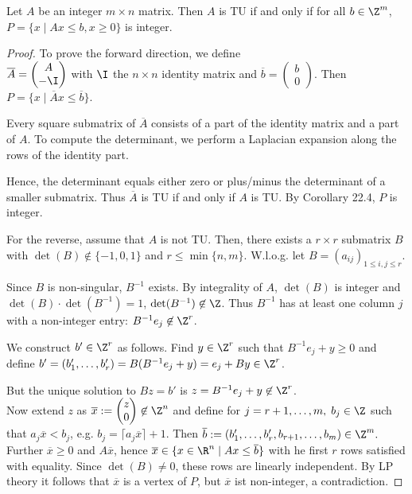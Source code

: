 \begin{thm}
Let $A$ be an integer $m \times n$ matrix.
Then $A$ is TU if and only if for all $b \in \Z^m$, $P = \{x \mid Ax \leq b,
x \geq 0\}$ is integer.
\end{thm}
\begin{proof}
To prove the forward direction, we define \\
$\overline{A} = \begin{pmatrix} A \\ -\I \end{pmatrix}$ with $\I$ the $n
\times n$ identity matrix and $\overline{b} = \begin{pmatrix} b \\ 0
\end{pmatrix}$.
Then $P = \{ x \mid \overline{A} x \leq \overline{b} \}$.

Every square submatrix of $\overline{A}$ consists of a part of the identity
matrix and a part of $A$. To compute the determinant, we perform a Laplacian
expansion along the rows of the identity part.

Hence, the determinant equals either zero or plus/minus the determinant of a
smaller submatrix. Thus $\overline{A}$ is TU if and only if $A$ is TU.
By Corollary 22.4, $P$ is integer.

For the reverse, assume that $A$ is not TU.
Then, there exists a $r \times r$ submatrix $B$ with $\det(B) \not\in
\{-1,0,1\}$ and $r \leq \min\{n,m\}$.
W.l.o.g. let $B = (a_{ij})_{1 \leq i,j \leq r}$.

Since $B$ is non-singular, $B^{-1}$ exists. By integrality of $A$, $\det(B)$
is integer and $\det(B) \cdot \det(B^{-1}) = 1$, $\det(B^{-1}) \not\in \Z$.
Thus $B^{-1}$ has at least one column $j$ with a non-integer entry: 
$B^{-1} e_j \not\in \Z^r$.

We construct $b' \in \Z^r$ as follows. Find $y \in \Z^r$ such that $B^{-1}
e_j + y \geq 0$ and define $b' = (b_1', \dots, b_r') = B ( B^{-1} e_j + y) =
e_j + B y \in \Z^r$.

But the unique solution to $Bz=b'$ is $z = B^{-1}e_j+y \not\in \Z^r$. \\
 Now extend $z$ as $\overline{x}:=\begin{pmatrix} z \\ 0 \end{pmatrix} \not \in
\Z^n$ and define for $j=r+1,\dots,m, \; b_j \in \Z$ such that $a_j
\overline{x} < b_j$, e.g. $b_j = \lceil a_j \overline{x} \rceil +1$. Then $\overline b
:=(b_1', \dots, b_r', b_{r+1}, \dots, b_m) \in \Z^m.$ \\
Further $\overline x \geq 0$ and $A \overline x $, hence $\overline x \in
\{x \in \R^n \mid Ax \leq \overline b \}$ with he first $r$ rows satisfied
with equality. Since $\det(B) \neq 0$, these rows are linearly independent. By
LP theory it follows that $\overline x$ is a vertex of $P$, but $\overline x
$ ist non-integer, a contradiction.
\end{proof}

